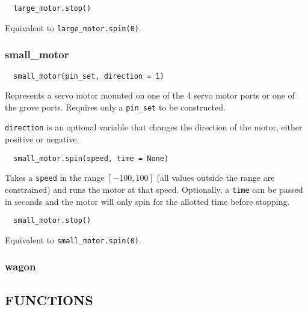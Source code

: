 \documentclass[12pt]{scrartcl} %
\begin{document}
\begin{verbatim}
  large_motor.stop()
\end{verbatim}

Equivalent to \texttt{large_motor.spin(0)}.

\subsubsection{small\_motor}

\begin{verbatim}
  small_motor(pin_set, direction = 1)
\end{verbatim}

Represents a servo motor mounted on one of the 4 servo motor ports or one of
the grove ports. Requires only a \texttt{pin_set} to be
constructed.

\texttt{direction} is an optional variable that changes the
direction of the motor, either positive or negative.

\begin{verbatim}
  small_motor.spin(speed, time = None)
\end{verbatim}

Takes a \texttt{speed} in the range $[-100, 100]$ (all values
outside the range are constrained) and runs the motor at that speed.
Optionally, a \texttt{time} can be passed in seconds and the motor
will only spin for the allotted time before stopping.

\begin{verbatim}
  small_motor.stop()
\end{verbatim}

Equivalent to \texttt{small_motor.spin(0)}.

\subsubsection{wagon}

\subsection{FUNCTIONS}
\end{document}
